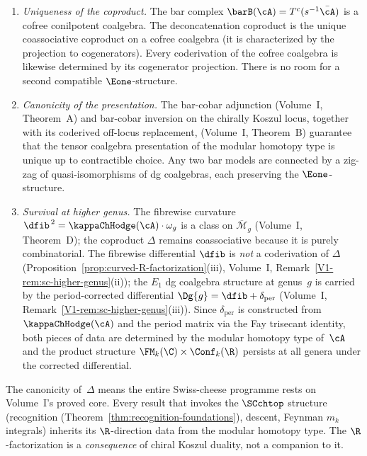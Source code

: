 \begin{proposition}
\label{prop:R-canonical-vol2}%
\begin{enumerate}[label=\textup{(\roman*)}]
\item \emph{Uniqueness of the coproduct.}
 The bar complex $\barB(\cA) = T^c(s^{-1}\bar{\cA})$ is a
 cofree conilpotent coalgebra. The deconcatenation
 coproduct is the unique coassociative coproduct on a cofree
 coalgebra \textup(it is characterized by the projection to
 cogenerators\textup). Every coderivation of the cofree
 coalgebra is likewise determined by its cogenerator projection.
 There is no room for a second compatible $\Eone$-structure.
\item \emph{Canonicity of the presentation.}
 The bar-cobar adjunction \textup(Volume~I, Theorem~A\textup)
 and bar-cobar inversion on the chirally Koszul locus, together
 with its coderived off-locus replacement,
 \textup(Volume~I, Theorem~B\textup)
 guarantee that the tensor coalgebra presentation of the
 modular homotopy type is unique up to contractible choice.
 Any two bar models are connected by a zig-zag of
 quasi-isomorphisms of dg coalgebras, each preserving the
 $\Eone$-structure.
\item \emph{Survival at higher genus.}
 The fibrewise curvature
 $\dfib^{\,2} = \kappaChHodge(\cA) \cdot \omega_g$ is a class on
 $\overline{\mathcal{M}}_g$
 (Volume~I, Theorem~D); the coproduct $\Delta$ remains
 coassociative because it is purely combinatorial. The
 fibrewise differential $\dfib$ is \emph{not} a coderivation
 of $\Delta$
 (Proposition~\ref{prop:curved-R-factorization}\textup{(iii)},
 Volume~I,
 Remark~\ref{V1-rem:sc-higher-genus}\textup{(ii)}); the
 $E_1$ dg coalgebra structure at genus~$g$ is carried by
 the period-corrected differential
 $\Dg{g} = \dfib + \delta_{\mathrm{per}}$
 (Volume~I,
 Remark~\ref{V1-rem:sc-higher-genus}\textup{(iii)}). Since
 $\delta_{\mathrm{per}}$ is constructed from $\kappaChHodge(\cA)$ and
 the period matrix via the Fay trisecant identity, both pieces
 of data are determined by the modular homotopy type of~$\cA$
 and the product structure $\FM_k(\C)\times\Conf_k(\R)$
 persists at all genera under the corrected differential.
\end{enumerate}
\end{proposition}

\begin{remark}
\label{rem:R-canonical-consequence}
The canonicity of~$\Delta$ means the entire Swiss-cheese
programme rests on Volume~I's proved core. Every result
that invokes the $\SCchtop$ structure (recognition
(Theorem~\ref{thm:recognition-foundations}), descent, Feynman $m_k$
integrals) inherits its $\R$-direction data from the
modular homotopy type. The $\R$-factorization is a
\emph{consequence} of chiral Koszul duality, not a
companion to it.
\end{remark}

